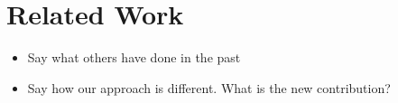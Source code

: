 \section{Related Work}
\begin{itemize}
  \item Say what others have done in the past
  \item Say how our approach is different. What is the new contribution?
\end{itemize}
%
\cite{DisparateImpact}
%
%
